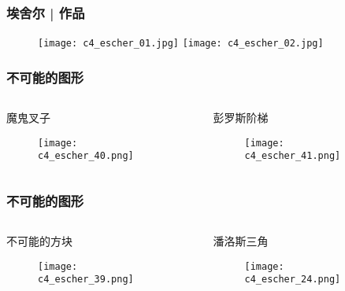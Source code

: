 \begin{frame}
  \frametitle{埃舍尔 | 作品}
  \begin{figure}
    \centering
    \texttt{[image: c4\_escher\_01.jpg]}\quad
    \texttt{[image: c4\_escher\_02.jpg]}
  \end{figure}
\end{frame}

\begin{frame}
  \frametitle{不可能的图形}
  \begin{columns}
    \begin{block}{魔鬼叉子}
      \begin{figure}
        \centering
        \texttt{[image: c4\_escher\_40.png]}
      \end{figure}
    \end{block}
    \begin{block}{彭罗斯阶梯}
      \begin{figure}
        \centering
        \texttt{[image: c4\_escher\_41.png]}
      \end{figure}
    \end{block}
  \end{columns}
\end{frame}

\begin{frame}
  \frametitle{不可能的图形}
  \begin{columns}
    \begin{block}{不可能的方块}
      \begin{figure}
        \centering
        \texttt{[image: c4\_escher\_39.png]}
      \end{figure}
    \end{block}
    \begin{block}{潘洛斯三角}
      \begin{figure}
        \centering
        \texttt{[image: c4\_escher\_24.png]}
      \end{figure}
    \end{block}
  \end{columns}
\end{frame}

